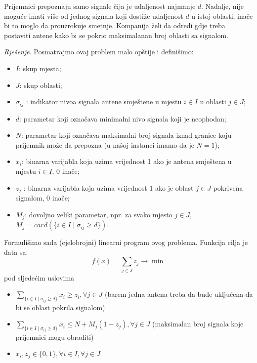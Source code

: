 \documentclass[a4paper, utf8, 11pt, colorlinks]{book}
\begin{document}
Prijemnici prepoznaju samo signale čija je udaljenost najmanje   $d$. Nadalje, nije moguće imati više od jednog signala koji dostiže udaljenost $d$ u istoj oblasti, inače bi to moglo da prouzrokuje smetnje. %
Kompanija želi da odredi gdje treba postaviti antene kako bi se pokrio maksimalanan broj oblasti sa signalom. 

\emph{Rješenje}. Posmatrajmo ovaj problem malo opštije i definišimo: 
\begin{itemize}
	\item $I$: skup mjesta;
	\item $J$: skup oblasti;
	\item $\sigma_{ij}$ : indikator nivoa signala antene   smještene u mjestu $i \in I$ u oblasti $j \in J$;
	\item $d$: parametar koji označava minimalni nivo signala koji je neophodan;
	\item $N$: parametar koji označava maksimalni broj signala iznad granice koju prijemnik može da prepozna (u našoj instanci imamo da je $N=1$);
	\item $x_i$: binarna varijabla koja uzima vrijednost 1 ako je antena smještena u mjestu $i\in I$, 0 inače;
	\item  $z_j$ : binarna varijabla koja uzima vrijednost 1 ako je oblast $j \in J$ pokrivena signalom, 0 inače;
	\item $M_j$: dovoljno veliki parametar, npr. za svako mjesto $j \in J$, $M_j= card(\{ i \in I \mid \sigma_{ij} \geq d\})$.
\end{itemize}
Formulišimo sada (cjelobrojni) linearni program ovog problema. 
Funkcija cilja je data sa:
$$ f(x) = \sum_{j \in J} z_j \rightarrow \min $$
pod sljedećim uslovima 
\begin{itemize}
	\item  $ \sum_{\{i \in I \mid \sigma_{ij} \geq d \}} x_i \geq z_i, \forall j \in J $ (barem jedna antena treba da bude uključena da bi se oblast pokrila signalom)
	\item $ \sum_{\{i \in I \mid \sigma_{ij} \geq d \}} x_i  \leq N + M_j( 1 - z_j), \forall j \in J $ (maksimalan broj signala koje prijemnici mogu obraditi)  
	\item $x_i, z_j \in\{0, 1\}, \forall i \in I, \forall j \in J$
\end{itemize}
\end{document}
